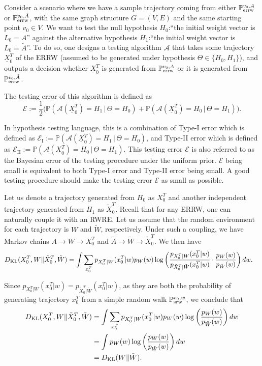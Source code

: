 \documentclass[a4paper, 11pt]{article}
\renewcommand{\P}{\mathbb{P}}
\newcommand{\dkl}{D_{\textnormal{KL}}}
\newcommand{\Psrw}{\P_{\textnormal{srw}}}
\newcommand{\Perrw}{\P_{\textnormal{errw}}}
\newif\ifva
\begin{document}
Consider a scenario where we have a sample trajectory coming from either $\Perrw^{v_0, A}$ or $\Perrw^{v_0, \tilde{A}}$, with the same graph structure $G=(V, E)$ and the same starting point $v_0\in V$. We want to test the null hypothesis $H_0$:``the initial weight vector is $L_0=A$'' against the alternative hypothesis $H_1$:``the initial weight vector is $L_0=\tilde{A}$''. To do so, one designs a testing algorithm $\mathcal{A}$ that takes some trajectory $\underline{X}_0^T$ of the ERRW (assumed to be generated under hypothesis $\Theta\in\{H_0, H_1\}$), and outputs a decision whether $\underline{X}_0^T$ is generated from $\Perrw^{v_0, A}$ 
or it is generated from $\Perrw^{v_0,\tilde{A}}$. 
\ifva
\color{red}
\color{black}
\fi
The testing error of this algorithm is defined as
\[\mathcal{E}:=\frac{1}{2}\big(\P(\mathcal{A}(\underline{X}_0^T)=H_1\,|\,\Theta=H_0)+\P(\mathcal{A}(\underline{X}_0^T)=H_0\,|\,\Theta=H_1)\big).\]

In hypothesis testing language, this is a combination of Type-I error which is defined as $\mathcal{E}_\text{I}:=\P(\mathcal{A}(\underline{X}_0^T)=H_1\,|\,\Theta=H_0)$, and Type-II error which is defined as $\mathcal{E}_{\text{II}}:=\P(\mathcal{A}(\underline{X}_0^T)=H_0\,|\,\Theta=H_1)$. This testing error $\mathcal{E}$ is also referred to as the Bayesian error of the testing procedure under the uniform prior. $\mathcal{E}$ being small is equivalent to both Type-I error and Type-II error being small. A good testing procedure should make the testing error $\mathcal{E}$ as small as possible. 

Let us denote a trajectory generated from $H_0$ as $X_0^T$ and another independent trajectory generated from $H_1$ as $\tilde{X}_0^T$. Recall that for any ERRW, one can naturally couple it with an RWRE. Let us assume that the random environment for each trajectory is $W$ and $\tilde{W}$, respectively. Under such a coupling, we have Markov chains $A\rightarrow W\rightarrow X_0^T$ and $\tilde{A}\rightarrow \tilde{W}\rightarrow \tilde{X}_0^T$. 
We then have
\begin{align*}
\dkl(X_0^T, W\|\tilde{X}_0^T, \tilde{W})
&=\int \sum_{x_0^T} p_{X_0^T|W}(x_0^T|w)p_W(w)\log\bigg(\frac{p_{X_0^T|W}(x_0^T|w)}{p_{\tilde{X}_0^T|\tilde{W}}(x_0^T|w)}\cdot \frac{p_W(w)}{p_{\tilde{W}}(w)}\bigg)\,dw.
\end{align*}

Since $p_{X_0^T|W}(x_0^T|w)=p_{\tilde{X}_0^T|\tilde{W}}(x_0^T|w)$, as they are both the probability of generating trajectory $x_0^T$ from a simple random walk $\Psrw^{v_0,w}$, we conclude that
\begin{align}
\label{eqn:kl1}
\dkl(X_0^T, W\|\tilde{X}_0^T, \tilde{W})
&= \int \sum_{x_0^T} p_{X_0^T|W}(x_0^T|w)p_W(w)\log\bigg(\frac{p_W(w)}{p_{\tilde{W}}(w)}\bigg)\,dw \nonumber\\
&= \int p_W(w)\log\bigg(\frac{p_W(w)}{p_{\tilde{W}}(w)}\bigg)\,dw \nonumber\\
&= \dkl(W\|\tilde{W}).
\end{align}
\end{document}
